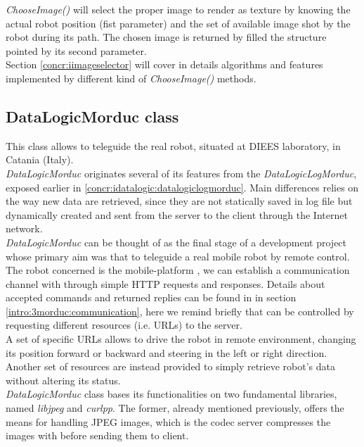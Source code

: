 \textit{ChooseImage()} will select the proper image to render as texture
by knowing the actual robot position (fist parameter) and the set of available
image shot by the robot during its path. The chosen image is returned by filled
the structure pointed by its second parameter.
\\
Section \ref{concr:iimageselector} will cover in details algorithms and
features implemented by different kind of \textit{ChooseImage()} methods.

\subsection{DataLogicMorduc class}
\label{concr:idatalogic:datalogicmorduc}

This class allows \framework{} to teleguide the real \morduc{}
robot, situated at DIEES laboratory, in Catania (Italy).
\\
\textit{DataLogicMorduc} originates several of its features 
from the \textit{DataLogicLogMorduc}, exposed earlier in
\ref{concr:idatalogic:datalogiclogmorduc}. Main differences
relies on the way new data are retrieved, since they are not
statically saved in log file but dynamically created and sent
from the server to the client through the Internet network.
\\
\textit{DataLogicMorduc} can be thought of as the final
stage of a development project whose primary aim was that
to teleguide a real mobile robot by remote control.
\\
The
robot concerned is the mobile-platform \morduc{}, we can
establish a communication channel with through simple
HTTP requests and responses. Details about accepted
commands and returned replies can be found in 
in section \ref{intro:3morduc:communication}, here we
remind briefly that \morduc{} can be controlled
by requesting different resources (i.e. URLs) to the server.
\\
A set of specific URLs allows to drive the robot in remote
environment, changing its position forward or backward and
steering in the left or right direction. Another set
of resources are instead provided to simply retrieve robot's
data without altering its status.
\\
\textit{DataLogicMorduc} class bases its functionalities
on two fundamental libraries, named \textit{libjpeg} and
\textit{curlpp}. The former, already mentioned previously,
offers the means for handling JPEG images, which is the codec
server compresses the images with before sending them to
client.
\\
